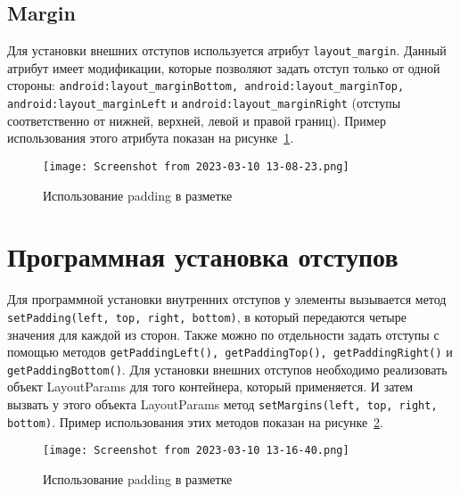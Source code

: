 \subsection{Margin}
Для установки внешних отступов используется атрибут \texttt{layout\_margin}.
Данный атрибут имеет модификации, которые позволяют задать отступ
только от одной стороны: \texttt{android:layout\_marginBottom,
android:layout\_marginTop, android:layout\_marginLeft} и
\texttt{android:layout\_marginRight} (отступы соответственно от нижней,
верхней, левой и правой границ).
Пример использования этого атрибута показан на рисунке~\ref{fig:xml:margin}.

\begin{figure}[h!tp]
	\centering
	\texttt{[image: Screenshot from 2023-03-10 13-08-23.png]}
	\caption{Использование padding в разметке}
	\label{fig:xml:margin}
\end{figure}

\section{Программная установка отступов}
Для программной установки внутренних отступов у элементы вызывается
метод \texttt{setPadding(left, top, right, bottom)},
в который передаются четыре значения для каждой из сторон.
Также можно по отдельности задать отступы с помощью методов
\texttt{getPaddingLeft(), getPaddingTop(), getPaddingRight()} и
\texttt{getPaddingBottom()}.
Для установки внешних отступов необходимо реализовать объект
LayoutParams для того контейнера, который применяется.
И затем вызвать у этого объекта LayoutParams метод
\texttt{setMargins(left, top, right, bottom)}.
Пример использования этих методов показан на рисунке~\ref{fig:java:pd_mrg}.

\begin{figure}[h!tp]
	\centering
	\texttt{[image: Screenshot from 2023-03-10 13-16-40.png]}
	\caption{Использование padding в разметке}
	\label{fig:java:pd_mrg}
\end{figure}



